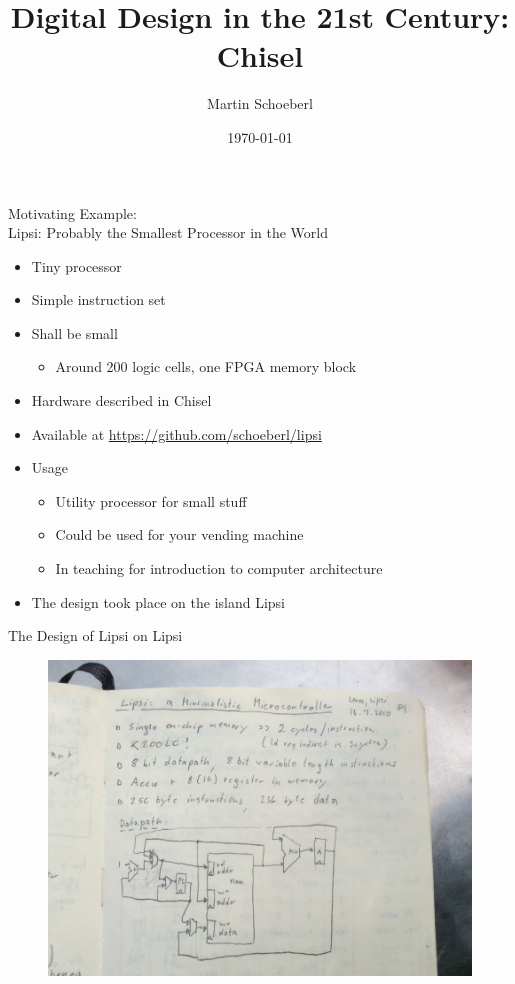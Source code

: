 \documentclass[xcolor=pdflatex,dvipsnames,table]{beamer}
\title{Digital Design in the 21st Century: Chisel}
\author{Martin Schoeberl}
\date{\today}
\institute{Technical University of Denmark}
\begin{document}
\begin{frame}
\titlepage
\end{frame}

\begin{frame}[fragile]{Motivating Example:\\
Lipsi: Probably the Smallest Processor in the World}
\begin{itemize}
\item Tiny processor
\item Simple instruction set
\item Shall be small
\begin{itemize}
\item Around 200 logic cells, one FPGA memory block
\end{itemize}
\item Hardware described in Chisel
\item Available at \url{https://github.com/schoeberl/lipsi}
\item Usage
\begin{itemize}
\item Utility processor for small stuff
\item Could be used for your vending machine
\item In teaching for introduction to computer architecture
\end{itemize}
\item The design took place on the island Lipsi
\end{itemize}
\end{frame}

\begin{frame}[fragile]{The Design of Lipsi on Lipsi}
\begin{figure}
    \centering
    \includegraphics[scale=0.3]{lipsi}
\end{figure}
\end{frame}
\end{document}
